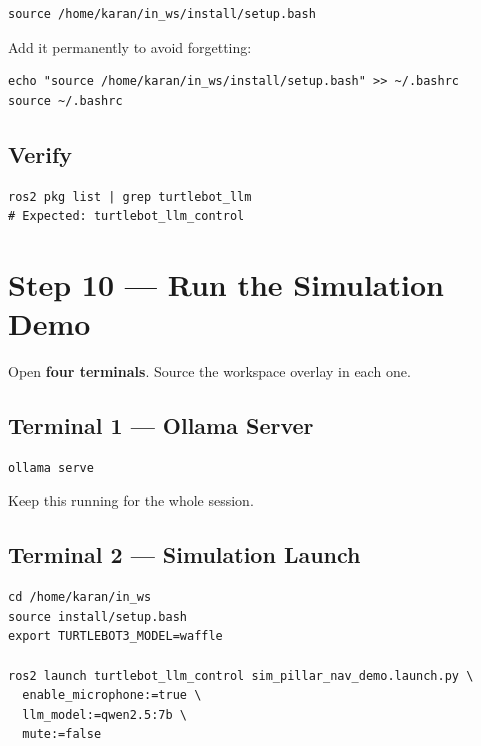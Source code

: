 \documentclass[12pt,a4paper]{report}
\begin{document}
\begin{lstlisting}[style=bashstyle]
source /home/karan/in_ws/install/setup.bash
\end{lstlisting}

Add it permanently to avoid forgetting:

\begin{lstlisting}[style=bashstyle]
echo "source /home/karan/in_ws/install/setup.bash" >> ~/.bashrc
source ~/.bashrc
\end{lstlisting}

\subsection{Verify}

\begin{lstlisting}[style=bashstyle]
ros2 pkg list | grep turtlebot_llm
# Expected: turtlebot_llm_control
\end{lstlisting}

\section{Step 10 --- Run the Simulation Demo}

Open \textbf{four terminals}.  Source the workspace overlay in each one.

\subsection{Terminal 1 --- Ollama Server}

\begin{lstlisting}[style=bashstyle]
ollama serve
\end{lstlisting}

Keep this running for the whole session.

\subsection{Terminal 2 --- Simulation Launch}

\begin{lstlisting}[style=bashstyle, caption={Launch the full simulation demo}]
cd /home/karan/in_ws
source install/setup.bash
export TURTLEBOT3_MODEL=waffle

ros2 launch turtlebot_llm_control sim_pillar_nav_demo.launch.py \
  enable_microphone:=true \
  llm_model:=qwen2.5:7b \
  mute:=false
\end{lstlisting}
\end{document}
